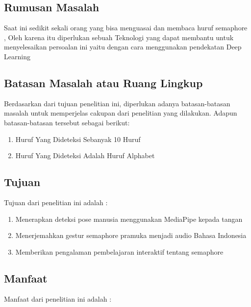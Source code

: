 \subsection{Rumusan Masalah}

Saat ini sedikit sekali orang yang bisa menguasai dan membaca huruf semaphore , Oleh karena itu diperlukan sebuah Teknologi yang dapat membantu untuk menyelesaikan persoalan ini yaitu dengan cara menggunakan pendekatan Deep Learning 


\subsection{Batasan Masalah atau Ruang Lingkup}

Berdasarkan dari tujuan penelitian ini, diperlukan adanya batasan-batasan masalah untuk memperjelas cakupan dari penelitian yang dilakukan. Adapun batasan-batasan tersebut sebagai berikut:

\begin{enumerate}
\item Huruf Yang Dideteksi Sebanyak 10 Huruf
\item Huruf Yang Dideteksi Adalah Huruf Alphabet 
\end{enumerate}


\subsection{Tujuan}




Tujuan dari penelitian ini adalah :

\begin{enumerate}   
\item	Menerapkan deteksi pose manusia menggunakan MediaPipe kepada tangan
\item	Menerjemahkan gestur semaphore pramuka menjadi audio Bahasa Indonesia
\item	Memberikan pengalaman pembelajaran interaktif tentang semaphore
\end{enumerate}


\subsection{Manfaat}

Manfaat dari penelitian ini adalah : 

